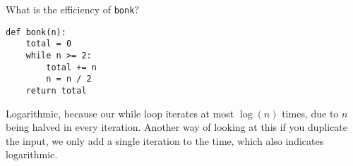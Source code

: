 \question
What is the efficiency of \texttt{bonk}?
\begin{lstlisting}
def bonk(n):
    total = 0
    while n >= 2:
        total += n
        n = n / 2
    return total
\end{lstlisting}

\begin{solution}[0.0in]
  Logarithmic, because our while loop iterates at most $\log(n)$ times,
  due to $n$ being halved in every iteration. Another way of looking at this if you
  duplicate the input, we only add a single iteration to the time, which also indicates logarithmic.
\end{solution}
